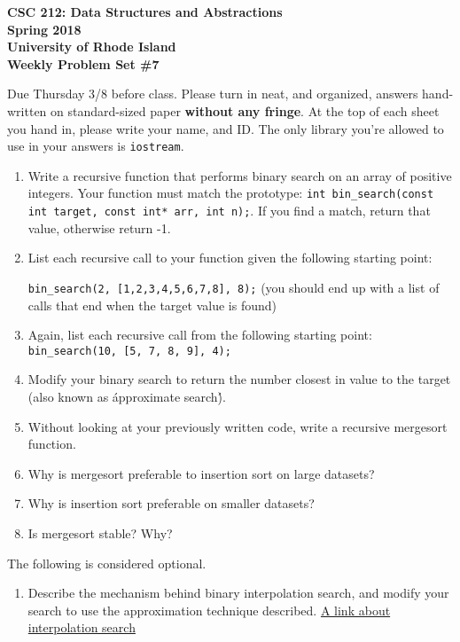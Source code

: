 \documentclass[11pt]{article}
\begin{document}
\thispagestyle{empty}

\begin{center}
    {\Large\bf CSC 212: Data Structures and Abstractions}\\
    \medskip
    {\Large\bf Spring 2018}\\
    \medskip
    {\Large\bf University of Rhode Island}\\
    \bigskip
    {\Large\bf Weekly Problem Set \#7}
\end{center}

Due Thursday 3/8 before class. Please turn in neat, and organized, answers hand-written on standard-sized paper \textbf{without any fringe}. At the top of each sheet you hand in, please write your name, and ID.
The only library you're allowed to use in your answers is \verb|iostream|.

\begin{enumerate}
    \item Write a recursive function that performs binary search on an array of positive integers. Your function must match the prototype: \verb|int bin_search(const int target, const int* arr, int n);|. If you find a match, return that value, otherwise return -1.

    \item List each recursive call to your function given the following starting point: 
    
    \verb|bin_search(2, [1,2,3,4,5,6,7,8], 8);| (you should end up with a list of calls that end when the target value is found)

    \item Again, list each recursive call from the following starting point: 
    \verb|bin_search(10, [5, 7, 8, 9], 4);|

    \item Modify your binary search to return the number closest in value to the target (also known as \'approximate search\'). 

    \item Without looking at your previously written code, write a recursive mergesort function.

    \item Why is mergesort preferable to insertion sort on large datasets?

    \item Why is insertion sort preferable on smaller datasets?

    \item Is mergesort stable? Why?

\end{enumerate}

The following is considered optional.

\begin{enumerate}
    \item Describe the mechanism behind binary interpolation search, and modify your search to use the approximation technique described. \href{https://en.wikipedia.org/wiki/Binary_search_algorithm}{A link about interpolation search}
\end{enumerate}

\label{r:lastpage}
\end{document}
